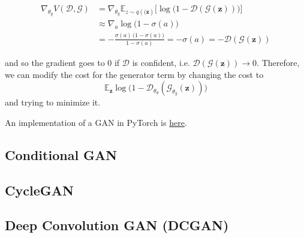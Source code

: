 \documentclass{article}
\begin{document}
  \begin{align*} 
    \nabla_{\theta_g} V(\mathcal{D}, \mathcal{G}) & = \nabla_{\theta_g} \mathbb{E}_{z \sim q(\mathbf(\mathbf{z})} \big[ \log \big( 1 - \mathcal{D}(\mathcal{G}(\mathbf{z}))\big) \big] \\
                                                  & \approx \nabla_a \log \big( 1 - \sigma(a)\big) \\
                                                  & = - \frac{\sigma(a) \, \big( 1 - \sigma(a)\big)}{1 - \sigma(a)} = - \sigma(a) = - \mathcal{D}(\mathcal{G}(\mathbf{z})) 
  \end{align*} 

  and so the gradient goes to $0$ if $\mathcal{D}$ is confident, i.e. $\mathcal{D}(\mathcal{G}(\mathbf{z})) \rightarrow 0$. Therefore, we can modify the cost for the generator term by changing the cost to 
  \begin{equation}
    \mathbb{E}_{\mathbf{z}} \log \big( 1 - \mathcal{D}_{\theta_d} ( \mathcal{G}_{\theta_g} (\mathbf{z}))\big)
  \end{equation}
  and trying to minimize it. 


  \begin{theorem}[Convergence]
    
  \end{theorem}

  \begin{algo}
    An implementation of a GAN in PyTorch is \href{code/gan.html}{here}. 
  \end{algo}

\subsection{Conditional GAN} 

\subsection{CycleGAN}

\subsection{Deep Convolution GAN (DCGAN)} 




\end{document}

